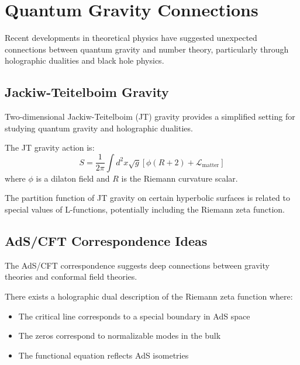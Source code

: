 \section{Quantum Gravity Connections}
\label{sec:quantum_gravity}

Recent developments in theoretical physics have suggested unexpected connections between quantum gravity and number theory, particularly through holographic dualities and black hole physics.

\subsection{Jackiw-Teitelboim Gravity}

Two-dimensional Jackiw-Teitelboim (JT) gravity provides a simplified setting for studying quantum gravity and holographic dualities.

\begin{definition}
\label{def:jt_action}
The JT gravity action is:
\begin{equation}
S = \frac{1}{2\pi} \int d^2x \sqrt{g} \left[ \phi (R + 2) + \mathcal{L}_{\text{matter}} \right]
\label{eq:jt_action}
\end{equation}
where $\phi$ is a dilaton field and $R$ is the Riemann curvature scalar.
\end{definition}

\begin{conjecture}
\label{conj:jt_zeta}
The partition function of JT gravity on certain hyperbolic surfaces is related to special values of L-functions, potentially including the Riemann zeta function.
\end{conjecture}

\subsection{AdS/CFT Correspondence Ideas}

The AdS/CFT correspondence suggests deep connections between gravity theories and conformal field theories.

\begin{hypothesis}
\label{hyp:ads_cft_rh}
There exists a holographic dual description of the Riemann zeta function where:
\begin{itemize}
\item The critical line corresponds to a special boundary in AdS space
\item The zeros correspond to normalizable modes in the bulk
\item The functional equation reflects AdS isometries
\end{itemize}
\end{hypothesis}

